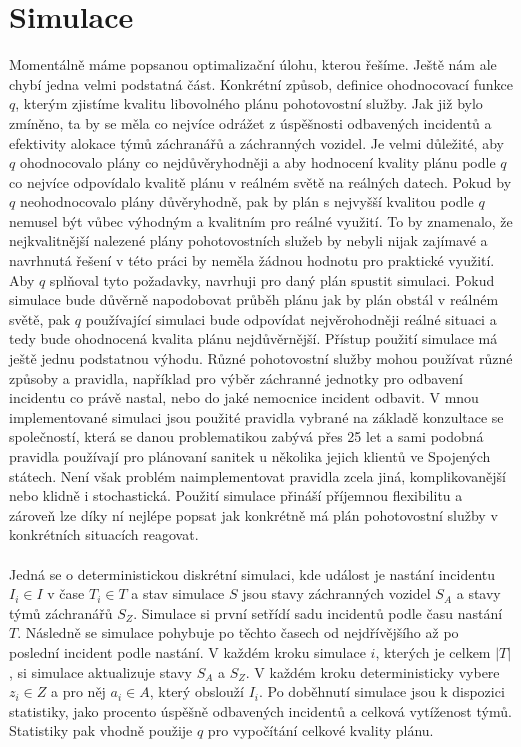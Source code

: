\clearpage

\section{Simulace}

Momentálně máme popsanou optimalizační úlohu, kterou řešíme. Ještě nám ale chybí jedna velmi podstatná část.
Konkrétní způsob, definice ohodnocovací funkce $q$, kterým zjistíme kvalitu libovolného plánu pohotovostní služby.
Jak již bylo zmíněno, ta by se měla co nejvíce odrážet z úspěšnosti odbavených incidentů a efektivity alokace týmů záchranářů a záchranných vozidel.
Je velmi důležité, aby $q$ ohodnocovalo plány co nejdůvěryhodněji a aby hodnocení kvality plánu podle $q$ co nejvíce odpovídalo kvalitě plánu v reálném světě na reálných datech.
Pokud by $q$ neohodnocovalo plány důvěryhodně, pak by plán s nejvyšší kvalitou podle $q$ nemusel být vůbec výhodným a kvalitním pro reálné využití.
To by znamenalo, že nejkvalitnější nalezené plány pohotovostních služeb by nebyli nijak zajímavé a navrhnutá řešení v této práci by neměla žádnou hodnotu pro praktické využití.
Aby $q$ splňoval tyto požadavky, navrhuji pro daný plán spustit simulaci.
Pokud simulace bude důvěrně napodobovat průběh plánu jak by plán obstál v reálném světě, pak $q$ používající simulaci
bude odpovídat nejvěrohodněji reálné situaci a tedy bude ohodnocená kvalita plánu nejdůvěrnější.
Přístup použití simulace má ještě jednu podstatnou výhodu.
Různé pohotovostní služby mohou používat různé způsoby a pravidla, například pro výběr záchranné jednotky pro odbavení incidentu co právě nastal, nebo do jaké nemocnice incident odbavit.
V mnou implementované simulaci jsou použité pravidla vybrané na základě konzultace se společností, která se danou problematikou zabývá přes 25 let a sami podobná pravidla používají pro plánovaní sanitek
u několika jejich klientů ve Spojených státech.
Není však problém naimplementovat pravidla zcela jiná, komplikovanější nebo klidně i stochastická.
Použití simulace přináší příjemnou flexibilitu a zároveň lze díky ní nejlépe popsat jak konkrétně má plán pohotovostní služby v konkrétních situacích reagovat.
\\
\\
Jedná se o deterministickou diskrétní simulaci, kde událost je nastání incidentu $I_i \in I$ v čase $T_i \in T$ a stav simulace $S$
jsou stavy záchranných vozidel $S_A$ a stavy týmů záchranářů $S_Z$.
Simulace si první setřídí sadu incidentů podle času nastání $T$.
Následně se simulace pohybuje po těchto časech od nejdřívějšího až po poslední incident podle nastání.
V každém kroku simulace $i$, kterých je celkem $|T|$, si simulace aktualizuje stavy $S_A$ a $S_Z$.
V každém kroku deterministicky vybere $z_i \in Z$ a pro něj $a_i \in A$, který obslouží $I_i$. 
Po doběhnutí simulace jsou k dispozici statistiky, jako procento úspěšně odbavených incidentů a celková vytíženost týmů.
Statistiky pak vhodně použije $q$ pro vypočítání celkové kvality plánu.

